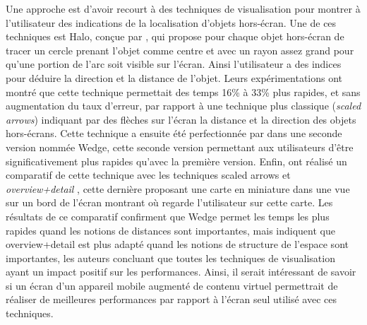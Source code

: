 Une approche est d'avoir recourt à des techniques de visualisation pour montrer à l'utilisateur des indications de la localisation d'objets hors-écran. Une de ces techniques est Halo, conçue par \citet{BaudischRosenholtz2003}, qui propose pour chaque objet hors-écran de tracer un cercle prenant l'objet comme centre et avec un rayon assez grand pour qu'une portion de l'arc soit visible sur l'écran. Ainsi l'utilisateur a des indices pour déduire la direction et la distance de l'objet. Leurs expérimentations ont montré que cette technique permettait des temps 16\% à 33\% plus rapides, et sans augmentation du taux d'erreur, par rapport à une technique plus classique (\emph{scaled arrows}) indiquant par des flèches sur l'écran la distance et la direction des objets hors-écrans. Cette technique a ensuite été perfectionnée par \citet{GustafsonBaudischGutwinEtAl2008} dans une seconde version nommée Wedge, cette seconde version permettant aux utilisateurs d'être significativement plus rapides qu'avec la première version. Enfin, \citet{BurigatChittaro2011} ont réalisé un comparatif de cette technique avec les techniques \foreignlanguage{english}{scaled arrows} et \emph{overview+detail} , cette dernière proposant une carte en miniature dans une vue sur un bord de l'écran montrant où regarde l'utilisateur sur cette carte. Les résultats de ce comparatif confirment que Wedge permet les temps les plus rapides quand les notions de distances sont importantes, mais indiquent que overview+detail est plus adapté quand les notions de structure de l'espace sont importantes, les auteurs concluant que toutes les techniques de visualisation ayant un impact positif sur les performances. Ainsi, il serait intéressant de savoir si un écran d'un appareil mobile augmenté de contenu virtuel permettrait de réaliser de meilleures performances par rapport à l'écran seul utilisé avec ces techniques.


